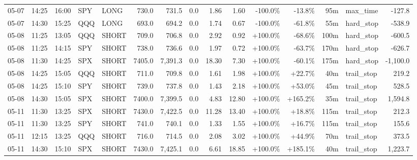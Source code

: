 \documentclass[11pt,a4paper,twoside]{article}
\begin{document}
\begin{landscape}
\begin{center}
\begin{longtable}{>{\color{txtmain}}l l l l l r r r r r r r r >{\color{txtmain}}l r}
05-07 & 14:25 & 16:00 & SPY & LONG & 730.0 & 731.5 & 0.0 & 1.86 & 1.60 & \textcolor{lossred}{-100.0\%} & \textcolor{lossred}{-13.8\%} & 95m & max\_time & \textcolor{lossred}{-127.8} \\
05-07 & 14:30 & 15:25 & QQQ & LONG & 693.0 & 694.2 & 0.0 & 1.74 & 0.67 & \textcolor{lossred}{-100.0\%} & \textcolor{lossred}{-61.8\%} & 55m & hard\_stop & \textcolor{lossred}{-538.9} \\
05-08 & 11:25 & 13:05 & QQQ & SHORT & 709.0 & 706.8 & 0.0 & 2.92 & 0.92 & \textcolor{wingreen}{+100.0\%} & \textcolor{lossred}{-68.6\%} & 100m & hard\_stop & \textcolor{lossred}{-600.5} \\
05-08 & 11:25 & 14:15 & SPY & SHORT & 738.0 & 736.6 & 0.0 & 1.97 & 0.72 & \textcolor{wingreen}{+100.0\%} & \textcolor{lossred}{-63.7\%} & 170m & hard\_stop & \textcolor{lossred}{-626.7} \\
05-08 & 11:30 & 14:25 & SPX & SHORT & 7405.0 & 7,391.3 & 0.0 & 18.30 & 7.30 & \textcolor{wingreen}{+100.0\%} & \textcolor{lossred}{-60.1\%} & 175m & hard\_stop & \textcolor{lossred}{-1,100.0} \\
05-08 & 14:25 & 15:05 & QQQ & SHORT & 711.0 & 709.8 & 0.0 & 1.61 & 1.98 & \textcolor{wingreen}{+100.0\%} & \textcolor{wingreen}{+22.7\%} & 40m & trail\_stop & \textcolor{wingreen}{219.2} \\
05-08 & 14:25 & 15:10 & SPY & SHORT & 739.0 & 737.8 & 0.0 & 1.43 & 2.18 & \textcolor{wingreen}{+100.0\%} & \textcolor{wingreen}{+53.0\%} & 45m & trail\_stop & \textcolor{wingreen}{528.5} \\
05-08 & 14:30 & 15:05 & SPX & SHORT & 7400.0 & 7,399.5 & 0.0 & 4.83 & 12.80 & \textcolor{wingreen}{+100.0\%} & \textcolor{wingreen}{+165.2\%} & 35m & trail\_stop & \textcolor{wingreen}{1,594.8} \\
05-11 & 11:30 & 13:25 & SPX & SHORT & 7430.0 & 7,422.5 & 0.0 & 11.28 & 13.40 & \textcolor{wingreen}{+100.0\%} & \textcolor{wingreen}{+18.8\%} & 115m & trail\_stop & \textcolor{wingreen}{212.3} \\
05-11 & 11:30 & 13:25 & SPY & SHORT & 741.0 & 740.1 & 0.0 & 1.33 & 1.55 & \textcolor{wingreen}{+100.0\%} & \textcolor{wingreen}{+16.7\%} & 115m & trail\_stop & \textcolor{wingreen}{155.6} \\
05-11 & 12:15 & 13:25 & QQQ & SHORT & 716.0 & 714.5 & 0.0 & 2.08 & 3.02 & \textcolor{wingreen}{+100.0\%} & \textcolor{wingreen}{+44.9\%} & 70m & trail\_stop & \textcolor{wingreen}{373.5} \\
05-11 & 14:30 & 15:10 & SPX & SHORT & 7430.0 & 7,425.1 & 0.0 & 6.61 & 18.85 & \textcolor{wingreen}{+100.0\%} & \textcolor{wingreen}{+185.1\%} & 40m & trail\_stop & \textcolor{wingreen}{1,223.7} \\

\end{longtable}
\end{center}
\end{landscape}
\end{document}
